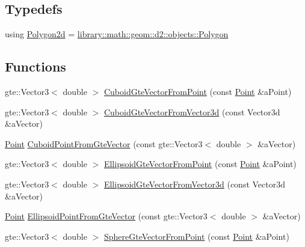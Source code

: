 \subsection*{Typedefs}
\begin{DoxyCompactItemize}
\item 
using \hyperlink{namespacelibrary_1_1math_1_1geom_1_1d3_1_1objects_ae339035ccf9a6f4f0d2945fdcfd76f95}{Polygon2d} = \hyperlink{classlibrary_1_1math_1_1geom_1_1d2_1_1objects_1_1_polygon}{library\+::math\+::geom\+::d2\+::objects\+::\+Polygon}
\end{DoxyCompactItemize}
\subsection*{Functions}
\begin{DoxyCompactItemize}
\item 
gte\+::\+Vector3$<$ double $>$ \hyperlink{namespacelibrary_1_1math_1_1geom_1_1d3_1_1objects_a96c8edec8956345c9f085ef3073f1b3f}{Cuboid\+Gte\+Vector\+From\+Point} (const \hyperlink{classlibrary_1_1math_1_1geom_1_1d3_1_1objects_1_1_point}{Point} \&a\+Point)
\item 
gte\+::\+Vector3$<$ double $>$ \hyperlink{namespacelibrary_1_1math_1_1geom_1_1d3_1_1objects_a0afd2257f7c64d3588b9fd1f239e8c61}{Cuboid\+Gte\+Vector\+From\+Vector3d} (const Vector3d \&a\+Vector)
\item 
\hyperlink{classlibrary_1_1math_1_1geom_1_1d3_1_1objects_1_1_point}{Point} \hyperlink{namespacelibrary_1_1math_1_1geom_1_1d3_1_1objects_aec9df7f7d4b4c86cbc01f8cac5bd7268}{Cuboid\+Point\+From\+Gte\+Vector} (const gte\+::\+Vector3$<$ double $>$ \&a\+Vector)
\item 
gte\+::\+Vector3$<$ double $>$ \hyperlink{namespacelibrary_1_1math_1_1geom_1_1d3_1_1objects_ab4aff8d4a8f32b0cb22adb8a3ae1b2d8}{Ellipsoid\+Gte\+Vector\+From\+Point} (const \hyperlink{classlibrary_1_1math_1_1geom_1_1d3_1_1objects_1_1_point}{Point} \&a\+Point)
\item 
gte\+::\+Vector3$<$ double $>$ \hyperlink{namespacelibrary_1_1math_1_1geom_1_1d3_1_1objects_a907b60e23a36bd9550b27f90380c347e}{Ellipsoid\+Gte\+Vector\+From\+Vector3d} (const Vector3d \&a\+Vector)
\item 
\hyperlink{classlibrary_1_1math_1_1geom_1_1d3_1_1objects_1_1_point}{Point} \hyperlink{namespacelibrary_1_1math_1_1geom_1_1d3_1_1objects_afba4450ebf70aa313406e81b624abb96}{Ellipsoid\+Point\+From\+Gte\+Vector} (const gte\+::\+Vector3$<$ double $>$ \&a\+Vector)
\item 
gte\+::\+Vector3$<$ double $>$ \hyperlink{namespacelibrary_1_1math_1_1geom_1_1d3_1_1objects_a1cd4cc36a3501c95c8405d9f199b15a5}{Sphere\+Gte\+Vector\+From\+Point} (const \hyperlink{classlibrary_1_1math_1_1geom_1_1d3_1_1objects_1_1_point}{Point} \&a\+Point)

\end{DoxyCompactItemize}
